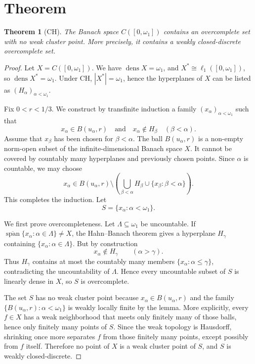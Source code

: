 \documentclass[11pt]{article}
\newtheorem{theorem}{Theorem}
\newcommand{\dens}{\operatorname{dens}}
\newcommand{\clspan}{\overline{\operatorname{span}}}
\begin{document}
\section*{Theorem}

\begin{theorem}[CH]
The Banach space \(C([0,\omega_1])\) contains an overcomplete set with no weak
cluster point. More precisely, it contains a weakly closed-discrete
overcomplete set.
\end{theorem}

\begin{proof}
Let \(X=C([0,\omega_1])\). We have \(\dens X=\omega_1\), and
\(X^*\cong \ell_1([0,\omega_1])\), so \(\dens X^*=\omega_1\). Under CH,
\(|X^*|=\omega_1\), hence the hyperplanes of \(X\) can be listed as
\((H_\alpha)_{\alpha<\omega_1}\).

Fix \(0<r<1/3\). We construct by transfinite induction a family
\((x_\alpha)_{\alpha<\omega_1}\) such that
\[
x_\alpha\in B(u_\alpha,r)
\quad\text{and}\quad
x_\alpha\notin H_\beta\quad(\beta<\alpha).
\]
Assume that \(x_\beta\) has been chosen for \(\beta<\alpha\). The ball
\(B(u_\alpha,r)\) is a non-empty norm-open subset of the infinite-dimensional
Banach space \(X\). It cannot be covered by countably many hyperplanes and
previously chosen points. Since \(\alpha\) is countable, we may choose
\[
x_\alpha\in B(u_\alpha,r)\setminus
\left(\bigcup_{\beta<\alpha}H_\beta\cup\{x_\beta:\beta<\alpha\}\right).
\]
This completes the induction. Let
\[
S=\{x_\alpha:\alpha<\omega_1\}.
\]

We first prove overcompleteness. Let \(\Lambda\subseteq\omega_1\) be
uncountable. If \(\clspan\{x_\alpha:\alpha\in\Lambda\}\neq X\), the
Hahn--Banach theorem gives a hyperplane \(H_\gamma\) containing
\(\{x_\alpha:\alpha\in\Lambda\}\). But by construction
\[
x_\alpha\notin H_\gamma\qquad(\alpha>\gamma).
\]
Thus \(H_\gamma\) contains at most the countably many members
\(\{x_\alpha:\alpha\leq\gamma\}\), contradicting the uncountability of
\(\Lambda\). Hence every uncountable subset of \(S\) is linearly dense in
\(X\), so \(S\) is overcomplete.

The set \(S\) has no weak cluster point because \(x_\alpha\in B(u_\alpha,r)\)
and the family \(\{B(u_\alpha,r):\alpha<\omega_1\}\) is weakly locally finite
by the lemma. More explicitly, every \(f\in X\) has a weak neighborhood that
meets only finitely many of those balls, hence only finitely many points of
\(S\). Since the weak topology is Hausdorff, shrinking once more separates
\(f\) from those finitely many points, except possibly from \(f\) itself.
Therefore no point of \(X\) is a weak cluster point of \(S\), and \(S\) is
weakly closed-discrete.
\end{proof}
\end{document}
